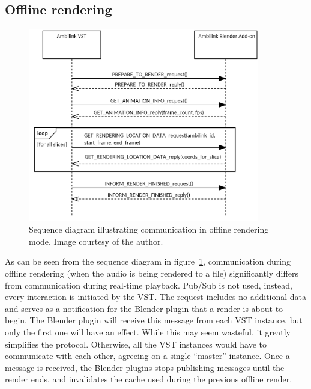 \subsection{Offline rendering}

\begin{figure}
    \centering
    \includegraphics[width=0.9\textwidth]{images/implementation/offline_render_comm_sequence.png}
    \caption{Sequence diagram illustrating communication in offline rendering mode.
             Image courtesy of the author. \label{fig:render_comm_sequence}}
\end{figure}

As can be seen from the sequence diagram in figure~\ref{fig:render_comm_sequence}, 
communication during offline rendering (when the audio is being rendered to a file) significantly differs from communication during real-time playback.
Pub/Sub is not used, instead, every interaction is initiated by the VST.
The  request includes no additional data and serves as a notification for the Blender plugin 
that a render is about to begin. The Blender plugin will receive this message from each VST instance,
but only the first one will have an effect. While this may seem wasteful, it greatly simplifies the protocol.
Otherwise, all the VST instances would have to communicate with each other, agreeing on a single ``master'' instance.
Once a  message is received, the Blender plugins stops publishing  messages until the render ends, and invalidates
the cache used during the previous offline render.

